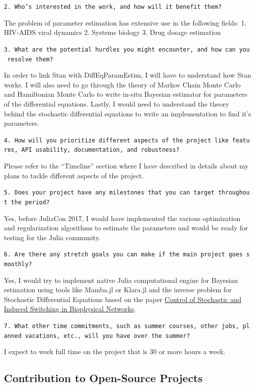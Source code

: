 \documentclass[11pt]{article}
\begin{document}
\texttt{2.\ Who’s\ interested\ in\ the\ work,\ and\ how\ will\ it\ benefit\ them?}

The problem of parameter estimation has extensive use in the following
fields: 1. HIV-AIDS viral dynamics 2. Systems biology 3. Drug dosage
estimation

\texttt{3.\ What\ are\ the\ potential\ hurdles\ you\ might\ encounter,\ and\ how\ can\ you\ resolve\ them?}

In order to link Stan with DiffEqParamEstim, I will have to understand
how Stan works. I will also need to go through the theory of Markov
Chain Monte Carlo and Hamiltonian Monte Carlo to write in-situ Bayesian
estimator for parameters of the differential equations. Lastly, I would
need to understand the theory behind the stochastic differential
equations to write an implementation to find it's parameters.

\texttt{4.\ How\ will\ you\ prioritize\ different\ aspects\ of\ the\ project\ like\ features,\ API\ usability,\ documentation,\ and\ robustness?}

Please refer to the ``Timeline'' section where I have described in
details about my plans to tackle different aspects of the project.

\texttt{5.\ Does\ your\ project\ have\ any\ milestones\ that\ you\ can\ target\ throughout\ the\ period?}

Yes, before JuliaCon 2017, I would have implemented the various
optimization and regularization algorithms to estimate the parameters
and would be ready for testing for the Julia community.

\texttt{6.\ Are\ there\ any\ stretch\ goals\ you\ can\ make\ if\ the\ main\ project\ goes\ smoothly?}

Yes, I would try to implement native Julia computational engine for
Bayesian estimation using tools like Mamba.jl or Klara.jl and the
inverse problem for Stochastic Differential Equations based on the paper
\href{http://journals.aps.org/prx/abstract/10.1103/PhysRevX.5.031036}{Control
of Stochastic and Induced Switching in Biophysical Networks}.

\texttt{7.\ What\ other\ time\ commitments,\ such\ as\ summer\ courses,\ other\ jobs,\ planned\ vacations,\ etc.,\ will\ you\ have\ over\ the\ summer?}

I expect to work full time on the project that is 30 or more hours a
week.

\subsection{Contribution to Open-Source
Projects}\label{contribution-to-open-source-projects}
\end{document}
